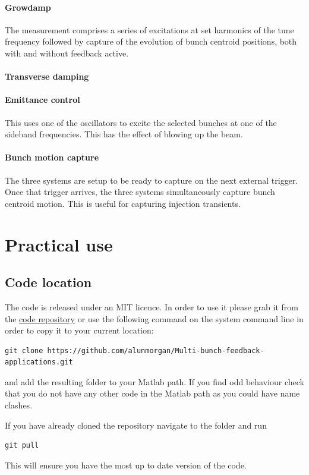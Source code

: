 \documentclass{report}
\begin{document}
\subsubsection{Growdamp}
The measurement comprises a series of excitations at set harmonics of the tune frequency followed by capture of the evolution of bunch centroid positions, both with and without feedback active.

\subsubsection{Transverse damping}

\subsubsection{Emittance control}
This uses one of the oscillators to excite the selected bunches at one of the sideband frequencies. This has the effect of blowing up the beam.

\subsubsection{Bunch motion capture}
The three systems are setup to be ready to capture on the next external trigger. Once that trigger arrives, the three systems simultaneously capture bunch centroid motion. This is useful for capturing injection transients. 

\chapter{Practical use}
\section{Code location }
The code is released under an MIT licence. In order to use it please grab it from the \href{https://github.com/alunmorgan/Multi-bunch-feedback-applications}{code repository}
or use the following command on the system command line in order to copy it to your current location:
\begin{verbatim}
git clone https://github.com/alunmorgan/Multi-bunch-feedback-applications.git
\end{verbatim}
and add the resulting folder to your Matlab path. If you find odd behaviour check that you do not have any other code in the Matlab path as you could have name clashes.

If you have already cloned the repository navigate to the folder and run 
\begin{verbatim}
git pull
\end{verbatim}
This will ensure you have the most up to date version of the code.
\end{document}
